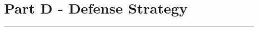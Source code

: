 \section*{Part D - Defense Strategy}

\noindent \begin{center}
\rule[0.5ex]{1\linewidth}{1pt}
\par\end{center}

\begin{comment}
Molina Health [1] is the latest in a long string of breaches in the healthcare sector [2,3,4]. Statistics
previously released, claim that one in three Americans' healthcare records were leaked as a result of
hacking and IT-related breaches in 2015 [5]. While the healthcare sector is not alone in this it often
strikes closer to home with consumers than other PII leakage.

Describe and discuss how the effective use of IT Audit could be used in the reduction of the risk of a
potential breach in an organisation. You should choose a suitable case study to illustrate your discussion.
You should consider some of the particular challenges in the healthcare sector.
Expected length 6-8 pages. (30)

[1] Molina Health Exposes Scores of Patient Records to Open Internet
https://www.infosecurity-magazine.com/news/molina-health-exposes-scores-of/

[2] PharmaNet breach compromises personal information of 7,50 0
http://www.cbc.ca/news/canada/british-columbia/bc-pharmanet-breach-1.3985173

[3] Lexington Medical Center latest victim of data breach http:
//www.wistv.com/story/34533649/lexington-medical-center-latest-victim-of-data-breach

[4] Top End Health Service breach exposes private details of cancer patients
https://www.databreaches.net/

au-top-end-health-service-breach-exposes-private-details-of-cancer-patients/
[5] https://www.bitglass.com/blog/1-in-3-affected-by-healthcare-breaches-in-2015

    
\end{comment}